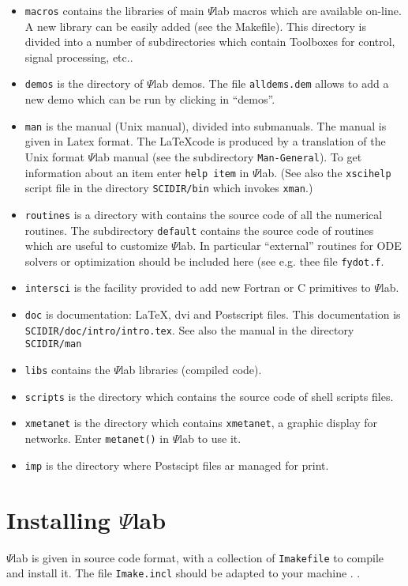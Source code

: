 \begin{itemize}
\item{{\tt macros} contains the libraries of main $\Psi$lab macros
which are available on-line. A new library can be easily added 
(see the Makefile). This directory is divided into a number of subdirectories
which contain Toolboxes for control, signal processing, etc..}

\item{{\tt demos} is the directory of $\Psi$lab demos. The file 
{\tt alldems.dem} allows to add a new demo which can be run by 
clicking in ``demos''.}

\item{{\tt man} is the manual (Unix manual), divided into submanuals.
The manual is given in Latex format. The \LaTeX code is produced by a 
translation of the Unix format $\Psi$lab manual (see the subdirectory
{\tt Man-General}).
To get information about an item enter {\tt help item} in $\Psi$lab.
(See also the {\tt xscihelp} script file in the directory {\tt SCIDIR/bin} 
which invokes {\tt xman}.)}


\item{{\tt routines} is a directory with contains the source code of all
the numerical routines. The subdirectory {\tt default} contains the
source code of routines which are useful to customize $\Psi$lab.}
In particular ``external'' routines for ODE solvers or optimization
should be included here (see e.g. thee file {\tt fydot.f}.
\item{{\tt intersci} is the facility provided to add new Fortran or C 
primitives to $\Psi$lab.}

\item{{\tt doc} is documentation: \LaTeX, dvi and Postscript files. 
This documentation is {\tt SCIDIR/doc/intro/intro.tex}. See 
also the manual in the directory {\tt SCIDIR/man}}

\item{{\tt libs} contains the $\Psi$lab libraries (compiled code).}

\item{{\tt scripts} is the directory which contains the source code of 
shell scripts files.}

\item{{\tt xmetanet} is the directory which contains {\tt xmetanet}, a 
graphic display for networks. Enter {\tt metanet()} in $\Psi$lab to use it.}

\item{{\tt imp}} is the directory where Postscipt files ar managed for
print.

\end{itemize}

\section{Installing $\Psi$lab}
\label{install}
$\Psi$lab is given in source code format, with a collection
of {\tt Imakefile} to compile and install it.
The file {\tt Imake.incl} should be adapted to your machine .  .

